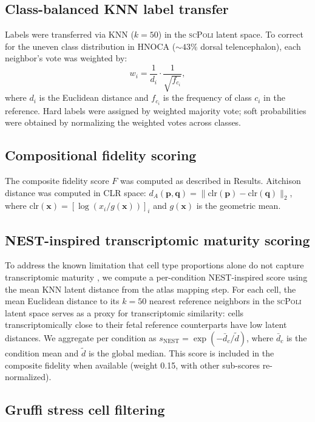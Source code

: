 \documentclass[times,twoside]{zHenriquesLab-StyleBioRxiv}
\newcommand{\hnoca}{\textsc{HNOCA}}
\newcommand{\scpoli}{\textsc{scPoli}}
\begin{document}
\subsection*{Class-balanced KNN label transfer}

Labels were transferred via KNN ($k{=}50$) in the \scpoli{} latent space. To correct for the uneven class distribution in \hnoca{} (${\sim}43\%$ dorsal telencephalon), each neighbor's vote was weighted by:
\begin{equation}
  w_i = \frac{1}{d_i} \cdot \frac{1}{\sqrt{f_{c_i}}},
\end{equation}
where $d_i$ is the Euclidean distance and $f_{c_i}$ is the frequency of class $c_i$ in the reference. Hard labels were assigned by weighted majority vote; soft probabilities were obtained by normalizing the weighted votes across classes.

\subsection*{Compositional fidelity scoring}

The composite fidelity score $F$ was computed as described in Results. Aitchison distance was computed in CLR space: $d_A(\bm{p}, \bm{q}) = \|\text{clr}(\bm{p}) - \text{clr}(\bm{q})\|_2$, where $\text{clr}(\bm{x}) = [\log(x_i / g(\bm{x}))]_i$ and $g(\bm{x})$ is the geometric mean.

\subsection*{NEST-inspired transcriptomic maturity scoring}

To address the known limitation that cell type proportions alone do not capture transcriptomic maturity \cite{He2024hnoca, Naas2025nest}, we compute a per-condition NEST-inspired score using the mean KNN latent distance from the atlas mapping step. For each cell, the mean Euclidean distance to its $k{=}50$ nearest reference neighbors in the \scpoli{} latent space serves as a proxy for transcriptomic similarity: cells transcriptomically close to their fetal reference counterparts have low latent distances. We aggregate per condition as $s_\text{NEST} = \exp(-\bar{d}_c / \tilde{d})$, where $\bar{d}_c$ is the condition mean and $\tilde{d}$ is the global median. This score is included in the composite fidelity when available (weight 0.15, with other sub-scores re-normalized).

\subsection*{Gruffi stress cell filtering}
\end{document}
